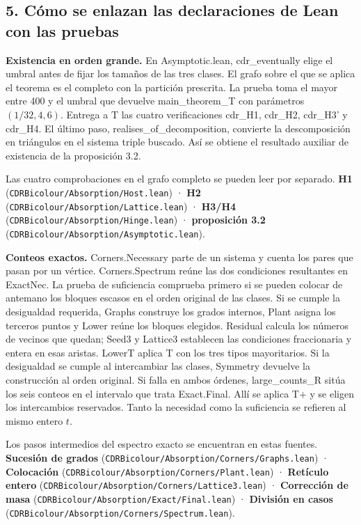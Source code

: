 \documentclass[spanish,11pt,a4paper]{article}
\begin{document}
\subsection{5. Cómo se enlazan las declaraciones de Lean con las pruebas}\label{cuxf3mo-se-enlazan-las-declaraciones-de-lean-con-las-pruebas}

\textbf{Existencia en orden grande.} En Asymptotic.lean, cdr\_eventually elige el umbral antes de fijar los tamaños de las tres clases. El grafo sobre el que se aplica el teorema es el completo con la partición prescrita. La prueba toma el mayor entre 400 y el umbral que devuelve main\_theorem\_T con parámetros \((1/32,4,6)\). Entrega a T las cuatro verificaciones cdr\_H1, cdr\_H2, cdr\_H3' y cdr\_H4. El último paso, realises\_of\_decomposition, convierte la descomposición en triángulos en el sistema triple buscado. Así se obtiene el resultado auxiliar de existencia de la proposición 3.2.

Las cuatro comprobaciones en el grafo completo se pueden leer por separado. \textbf{H1} (\texttt{CDRBicolour/\allowbreak{}Absorption/\allowbreak{}Host.\allowbreak{}lean}) · \textbf{H2} (\texttt{CDRBicolour/\allowbreak{}Absorption/\allowbreak{}Lattice.\allowbreak{}lean}) · \textbf{H3/H4} (\texttt{CDRBicolour/\allowbreak{}Absorption/\allowbreak{}Hinge.\allowbreak{}lean}) · \textbf{proposición 3.2} (\texttt{CDRBicolour/\allowbreak{}Absorption/\allowbreak{}Asymptotic.\allowbreak{}lean}).

\textbf{Conteos exactos.} Corners.Necessary parte de un sistema y cuenta los pares que pasan por un vértice. Corners.Spectrum reúne las dos condiciones resultantes en ExactNec. La prueba de suficiencia comprueba primero si se pueden colocar de antemano los bloques escasos en el orden original de las clases. Si se cumple la desigualdad requerida, Graphs construye los grados internos, Plant asigna los terceros puntos y Lower reúne los bloques elegidos. Residual calcula los números de vecinos que quedan; Seed3 y Lattice3 establecen las condiciones fraccionaria y entera en esas aristas. LowerT aplica T con los tres tipos mayoritarios. Si la desigualdad se cumple al intercambiar las clases, Symmetry devuelve la construcción al orden original. Si falla en ambos órdenes, large\_counts\_R sitúa los seis conteos en el intervalo que trata Exact.Final. Allí se aplica T+ y se eligen los intercambios reservados. Tanto la necesidad como la suficiencia se refieren al mismo entero \(t\).

Los pasos intermedios del espectro exacto se encuentran en estas fuentes. \textbf{Sucesión de grados} (\texttt{CDRBicolour/\allowbreak{}Absorption/\allowbreak{}Corners/\allowbreak{}Graphs.\allowbreak{}lean}) · \textbf{Colocación} (\texttt{CDRBicolour/\allowbreak{}Absorption/\allowbreak{}Corners/\allowbreak{}Plant.\allowbreak{}lean}) · \textbf{Retículo entero} (\texttt{CDRBicolour/\allowbreak{}Absorption/\allowbreak{}Corners/\allowbreak{}Lattice3.\allowbreak{}lean}) · \textbf{Corrección de masa} (\texttt{CDRBicolour/\allowbreak{}Absorption/\allowbreak{}Exact/\allowbreak{}Final.\allowbreak{}lean}) · \textbf{División en casos} (\texttt{CDRBicolour/\allowbreak{}Absorption/\allowbreak{}Corners/\allowbreak{}Spectrum.\allowbreak{}lean}).
\end{document}
